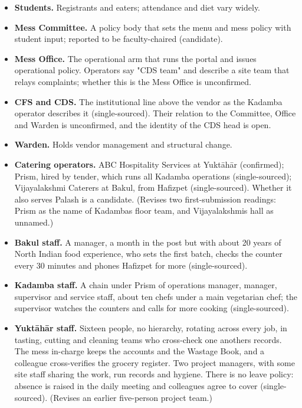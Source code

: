 \documentclass[
  10pt,
  table]{article}
\providecommand{\tightlist}{%
  \setlength{\itemsep}{0pt}\setlength{\parskip}{0pt}}
\renewcommand{\tightlist}{\setlength{\itemsep}{1.5pt}\setlength{\parskip}{0pt}}
\begin{document}
\begin{itemize}
\tightlist
\item
  \textbf{Students.} Registrants and eaters; attendance and diet vary widely.
\item
  \textbf{Mess Committee.} A policy body that sets the menu and mess policy with student input; reported to be faculty-chaired (candidate).
\item
  \textbf{Mess Office.} The operational arm that runs the portal and issues operational policy. Operators say "CDS team" and describe a site team that relays complaints; whether this is the Mess Office is unconfirmed.
\item
  \textbf{CFS and CDS.} The institutional line above the vendor as the Kadamba operator describes it (single-sourced). Their relation to the Committee, Office and Warden is unconfirmed, and the identity of the CDS head is open.
\item
  \textbf{Warden.} Holds vendor management and structural change.
\item
  \textbf{Catering operators.} ABC Hospitality Services at Yuktāhār (confirmed); Prism, hired by tender, which runs all Kadamba operations (single-sourced); Vijayalakshmi Caterers at Bakul, from Hafizpet (single-sourced). Whether it also serves Palash is a candidate. (Revises two first-submission readings: Prism as the name of Kadamba\textquotesingle s floor team, and Vijayalakshmi\textquotesingle s hall as unnamed.)
\item
  \textbf{Bakul staff.} A manager, a month in the post but with about 20 years of North Indian food experience, who sets the first batch, checks the counter every 30 minutes and phones Hafizpet for more (single-sourced).
\item
  \textbf{Kadamba staff.} A chain under Prism of operations manager, manager, supervisor and service staff, about ten chefs under a main vegetarian chef; the supervisor watches the counters and calls for more cooking (single-sourced).
\item
  \textbf{Yuktāhār staff.} Sixteen people, no hierarchy, rotating across every job, in tasting, cutting and cleaning teams who cross-check one another\textquotesingle s records. The mess in-charge keeps the accounts and the Wastage Book, and a colleague cross-verifies the grocery register. Two project managers, with some site staff sharing the work, run records and hygiene. There is no leave policy: absence is raised in the daily meeting and colleagues agree to cover (single-sourced). (Revises an earlier five-person project team.)

\end{itemize}
\end{document}
